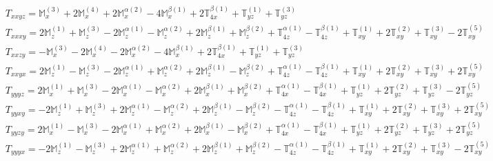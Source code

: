 \documentclass[fleqn,8pt,landscape]{jsarticle}
\begin{document}
\begin{align*}
& T_{xxyz} = \mathbb{M}_{x}^{(3)} + 2 \mathbb{M}_{x}^{(4)} + 2 \mathbb{M}_{x}^{\alpha(2)} - 4 \mathbb{M}_{x}^{\beta(1)} + 2 \mathbb{T}_{4x}^{\beta(1)} + \mathbb{T}_{yz}^{(1)} + \mathbb{T}_{yz}^{(3)} \\
& T_{xxxy} = 2 \mathbb{M}_{z}^{(1)} + \mathbb{M}_{z}^{(3)} - 2 \mathbb{M}_{z}^{\alpha(1)} - \mathbb{M}_{z}^{\alpha(2)} + 2 \mathbb{M}_{z}^{\beta(1)} + \mathbb{M}_{z}^{\beta(2)} + \mathbb{T}_{4z}^{\alpha(1)} - \mathbb{T}_{4z}^{\beta(1)} + \mathbb{T}_{xy}^{(1)} + 2 \mathbb{T}_{xy}^{(2)} + \mathbb{T}_{xy}^{(3)} - 2 \mathbb{T}_{xy}^{(5)} \\
& T_{xxzy} = - \mathbb{M}_{x}^{(3)} - 2 \mathbb{M}_{x}^{(4)} - 2 \mathbb{M}_{x}^{\alpha(2)} - 4 \mathbb{M}_{x}^{\beta(1)} + 2 \mathbb{T}_{4x}^{\beta(1)} + \mathbb{T}_{yz}^{(1)} + \mathbb{T}_{yz}^{(3)} \\
& T_{xxyx} = 2 \mathbb{M}_{z}^{(1)} - \mathbb{M}_{z}^{(3)} - 2 \mathbb{M}_{z}^{\alpha(1)} + \mathbb{M}_{z}^{\alpha(2)} + 2 \mathbb{M}_{z}^{\beta(1)} - \mathbb{M}_{z}^{\beta(2)} + \mathbb{T}_{4z}^{\alpha(1)} - \mathbb{T}_{4z}^{\beta(1)} + \mathbb{T}_{xy}^{(1)} + 2 \mathbb{T}_{xy}^{(2)} + \mathbb{T}_{xy}^{(3)} + 2 \mathbb{T}_{xy}^{(5)} \\
& T_{yyyz} = 2 \mathbb{M}_{x}^{(1)} + \mathbb{M}_{x}^{(3)} - 2 \mathbb{M}_{x}^{\alpha(1)} - \mathbb{M}_{x}^{\alpha(2)} + 2 \mathbb{M}_{x}^{\beta(1)} + \mathbb{M}_{x}^{\beta(2)} + \mathbb{T}_{4x}^{\alpha(1)} - \mathbb{T}_{4x}^{\beta(1)} + \mathbb{T}_{yz}^{(1)} + 2 \mathbb{T}_{yz}^{(2)} + \mathbb{T}_{yz}^{(3)} - 2 \mathbb{T}_{yz}^{(5)} \\
& T_{yyxy} = - 2 \mathbb{M}_{z}^{(1)} + \mathbb{M}_{z}^{(3)} + 2 \mathbb{M}_{z}^{\alpha(1)} - \mathbb{M}_{z}^{\alpha(2)} + 2 \mathbb{M}_{z}^{\beta(1)} - \mathbb{M}_{z}^{\beta(2)} - \mathbb{T}_{4z}^{\alpha(1)} - \mathbb{T}_{4z}^{\beta(1)} + \mathbb{T}_{xy}^{(1)} + 2 \mathbb{T}_{xy}^{(2)} + \mathbb{T}_{xy}^{(3)} + 2 \mathbb{T}_{xy}^{(5)} \\
& T_{yyzy} = 2 \mathbb{M}_{x}^{(1)} - \mathbb{M}_{x}^{(3)} - 2 \mathbb{M}_{x}^{\alpha(1)} + \mathbb{M}_{x}^{\alpha(2)} + 2 \mathbb{M}_{x}^{\beta(1)} - \mathbb{M}_{x}^{\beta(2)} + \mathbb{T}_{4x}^{\alpha(1)} - \mathbb{T}_{4x}^{\beta(1)} + \mathbb{T}_{yz}^{(1)} + 2 \mathbb{T}_{yz}^{(2)} + \mathbb{T}_{yz}^{(3)} + 2 \mathbb{T}_{yz}^{(5)} \\
& T_{yyyx} = - 2 \mathbb{M}_{z}^{(1)} - \mathbb{M}_{z}^{(3)} + 2 \mathbb{M}_{z}^{\alpha(1)} + \mathbb{M}_{z}^{\alpha(2)} + 2 \mathbb{M}_{z}^{\beta(1)} + \mathbb{M}_{z}^{\beta(2)} - \mathbb{T}_{4z}^{\alpha(1)} - \mathbb{T}_{4z}^{\beta(1)} + \mathbb{T}_{xy}^{(1)} + 2 \mathbb{T}_{xy}^{(2)} + \mathbb{T}_{xy}^{(3)} - 2 \mathbb{T}_{xy}^{(5)} \\

\end{align*}
\end{document}
